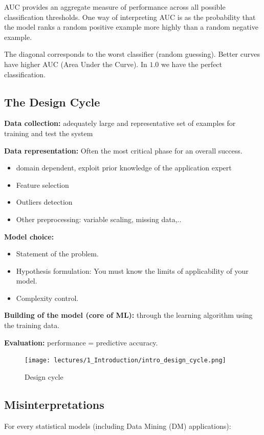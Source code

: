 \documentclass[../main.tex]{subfiles}
\begin{document}
AUC provides an aggregate measure of performance across all possible classification thresholds. One way of interpreting AUC is as the probability that the model ranks a random positive example more highly than a random negative example.

The diagonal corresponds to the worst classifier (random guessing). Better curves have higher AUC (Area Under the Curve). In $1.0$ we have the perfect classification.

\subsection{The Design Cycle}
\noindent\textbf{Data collection:} adequately large and representative set of examples for training and test the system

\noindent\textbf{Data representation:} Often the most critical phase for an overall success.
\begin{itemize}
    \item domain dependent, exploit prior knowledge of the application expert
    \item Feature selection
    \item Outliers detection
    \item Other preprocessing: variable scaling, missing data,..
\end{itemize}

\noindent\textbf{Model choice:}
\begin{itemize}
    \item Statement of the problem.
    \item Hypothesis formulation: You must know the limits of applicability of your model.
    \item Complexity control.
\end{itemize}
\noindent\textbf{Building of the model (core of ML):} through the learning algorithm using the training data.

\noindent\textbf{Evaluation:} performance = predictive accuracy.

\begin{figure}[ht]
    \centering
    \texttt{[image: lectures/1\_Introduction/intro\_design\_cycle.png]}
    \caption{Design cycle}
    \label{fig:intro_design_cycle}
\end{figure}

\subsection{Misinterpretations}
For every statistical models (including Data Mining (DM) applications):
\end{document}
